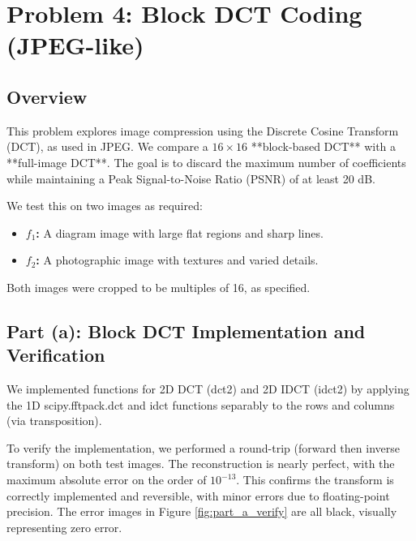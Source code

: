 \documentclass[11pt,a4paper]{article}
\begin{document}
\newpage
\section{Problem 4: Block DCT Coding (JPEG-like)}

\subsection{Overview}
This problem explores image compression using the Discrete Cosine Transform (DCT), as used in JPEG. We compare a $16 \times 16$ **block-based DCT** with a **full-image DCT**. The goal is to discard the maximum number of coefficients while maintaining a Peak Signal-to-Noise Ratio (PSNR) of at least 20 dB.

We test this on two images as required:
\begin{itemize}
    \item \textbf{$f_1$:} A diagram image with large flat regions and sharp lines.
    \item \textbf{$f_2$:} A photographic image with textures and varied details.
\end{itemize}
Both images were cropped to be multiples of 16, as specified.

\subsection{Part (a): Block DCT Implementation and Verification}
We implemented functions for 2D DCT (dct2) and 2D IDCT (idct2) by applying the 1D scipy.fftpack.dct and idct functions separably to the rows and columns (via transposition).

To verify the implementation, we performed a round-trip (forward then inverse transform) on both test images. The reconstruction is nearly perfect, with the maximum absolute error on the order of $10^{-13}$. This confirms the transform is correctly implemented and reversible, with minor errors due to floating-point precision. The error images in Figure \ref{fig:part_a_verify} are all black, visually representing zero error.
\end{document}
